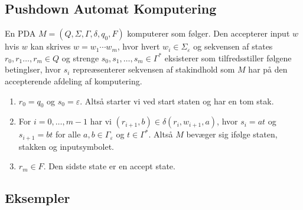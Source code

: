 \subsection{Pushdown Automat Komputering}%
\label{subsec:PDAKomputering}


En PDA $M = (Q, \Sigma, \Gamma, \delta, q_{0}, F)$ komputerer som følger. Den accepterer input $w$ hvis $w$ kan skrives $w = w_{1} \cdots w_{m}$, hvor hvert $w_{i} \in \Sigma_{\varepsilon}$ og sekvensen af states $r_{0}, r_{1} \ldots, r_{m} \in Q$ og strenge $s_{0}, s_{1}, \ldots, s_{m} \in \Gamma^{*}$ eksisterer som tilfredsstiller følgene betinglser, hvor $s_{i}$ repreæsenterer sekvensen af stakindhold som $M$ har på den accepterende afdeling af komputering.
\begin{enumerate}
	\item $r_{0} = q_{0}$ og $s_{0} = \varepsilon$. Altså starter vi ved start staten og har en tom stak.
	\item For $i = 0, \ldots, m-1$ har vi $(r_{i+1}, b) \in \delta(r_{i}, w_{i+1}, a)$, hvor $s_{i} = at$ og $s_{i+1} = bt$ for alle $a, b \in \Gamma_{\varepsilon}$ og $t \in \Gamma^{*}$. Altså $M$ bevæger sig ifølge staten, stakken og inputsymbolet.
	\item $r_{m} \in F$. Den sidste state er en accept state.
\end{enumerate}

\subsection{Eksempler}%
\label{subsec:pdaeksempler}

